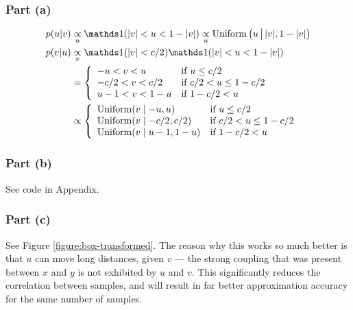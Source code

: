 \documentclass[12pt]{article}
\begin{document}
\subsubsection*{Part (a)}
\begin{align*}
    p(u|v) &\underset{u}{\propto} \I(|v|<u<1-|v|)
    \underset{u}{\propto} \Uniform\big(u\,\big\vert\, |v|,1-|v|\big)\\
    p(v|u) &\underset{v}{\propto} \I(|v|<c/2)\I(|v|<u<1-|v|) \\
    &=\left\{
        \begin{array}{ll}
            -u<v<u & \text{if } u\leq c/2 \\
            -c/2<v<c/2 & \text{if } c/2<u\leq 1-c/2 \\
            u-1<v<1-u & \text{if } 1-c/2<u
        \end{array}
    \right.\\
    &\propto\left\{
        \begin{array}{ll}
            \Uniform(v\mid -u,u) & \text{if } u\leq c/2 \\
            \Uniform(v\mid -c/2,c/2) & \text{if } c/2<u\leq 1-c/2 \\
            \Uniform(v\mid u-1,1-u) & \text{if } 1-c/2<u
        \end{array}
    \right.
\end{align*}

\subsubsection*{Part (b)}
See code in Appendix.

\subsubsection*{Part (c)}
See Figure \ref{figure:box-transformed}.
The reason why this works so much better is that $u$ can move long distances, given $v$ --- the strong coupling that was present between $x$
and $y$ is not exhibited by $u$ and $v$. This significantly reduces the correlation between samples, and will result in far better
approximation accuracy for the same number of samples.
\end{document}
